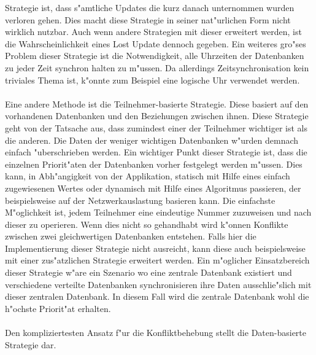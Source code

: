 \documentclass[a4paper,14pt]{scrreprt}
\begin{document}
Strategie ist, dass s"amtliche Updates die kurz danach unternommen wurden verloren gehen. Dies macht diese Strategie in seiner nat"urlichen Form nicht wirklich nutzbar. Auch wenn andere Strategien mit dieser erweitert werden, ist die Wahrscheinlichkeit eines Lost Update dennoch gegeben. Ein weiteres gro"ses Problem dieser Strategie ist die Notwendigkeit, alle Uhrzeiten der Datenbanken zu jeder Zeit synchron halten zu m"ussen. Da allerdings Zeitsynchronisation kein triviales Thema ist, k"onnte zum Beispiel eine logische Uhr verwendet werden.\\\\Eine andere Methode ist die Teilnehmer-basierte Strategie. Diese basiert auf den vorhandenen Datenbanken und den Beziehungen zwischen ihnen. Diese Strategie geht von der Tatsache aus, dass zumindest einer der Teilnehmer wichtiger ist als die anderen. Die Daten der weniger wichtigen Datenbanken w"urden demnach einfach "uberschrieben werden. Ein wichtiger Punkt dieser Strategie ist, dass die einzelnen Priorit"aten der Datenbanken vorher festgelegt werden m"ussen. Dies kann, in Abh"angigkeit von der Applikation, statisch mit Hilfe eines einfach zugewiesenen Wertes oder dynamisch mit Hilfe eines Algoritmus passieren, der beispielsweise auf der Netzwerkauslastung basieren kann. Die einfachste M"oglichkeit ist, jedem Teilnehmer eine eindeutige Nummer zuzuweisen und nach dieser zu operieren. Wenn dies nicht so gehandhabt wird k"onnen Konflikte zwischen zwei gleichwertigen Datenbanken entstehen. Falls hier die Implementierung dieser Strategie nicht ausreicht, kann diese auch beispielsweise mit einer zus"atzlichen Strategie erweitert werden. Ein m"oglicher Einsatzbereich dieser Strategie w"are ein Szenario wo eine zentrale Datenbank existiert und verschiedene verteilte Datenbanken synchronisieren ihre Daten ausschlie"slich mit dieser zentralen Datenbank. In diesem Fall wird die zentrale Datenbank wohl die h"ochste Priorit"at erhalten.\\\\Den kompliziertesten Ansatz f"ur die Konfliktbehebung stellt die Daten-basierte Strategie dar. 
\end{document}
